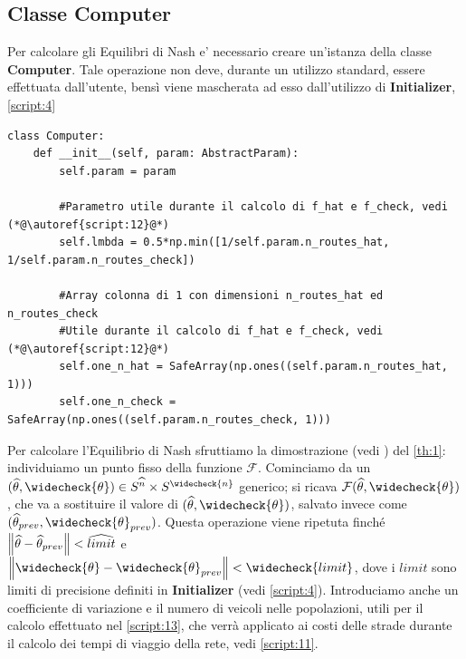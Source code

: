 \subsection{Classe Computer}
\label{subsec:Computer}

Per calcolare gli Equilibri di Nash e' necessario creare un'istanza della classe \textbf{Computer}. Tale operazione non deve, durante un utilizzo standard, essere effettuata dall'utente,
bensì viene mascherata ad esso dall'utilizzo di \textbf{Initializer}, \autoref{script:4}

\begin{lstlisting}[style=myStile, caption={Computer}, label={script:8}]
    class Computer:    
    def __init__(self, param: AbstractParam):
        self.param = param
        
        #Parametro utile durante il calcolo di f_hat e f_check, vedi (*@\autoref{script:12}@*)
        self.lmbda = 0.5*np.min([1/self.param.n_routes_hat, 1/self.param.n_routes_check])
        
        #Array colonna di 1 con dimensioni n_routes_hat ed n_routes_check 
        #Utile durante il calcolo di f_hat e f_check, vedi (*@\autoref{script:12}@*)
        self.one_n_hat = SafeArray(np.ones((self.param.n_routes_hat, 1)))
        self.one_n_check = SafeArray(np.ones((self.param.n_routes_check, 1)))
\end{lstlisting}

Per calcolare l'Equilibrio di Nash sfruttiamo la dimostrazione (vedi \cite[Cap. 4]{MR4911797}) del \autoref{th:1}: individuiamo un punto fisso della funzione $\mathcal{F}$.
Cominciamo da un $(\widehat{\theta}, \widecheck{\theta})\in S^{\widehat{n}}\times S^{\widecheck{n}}$ generico; si ricava $\mathcal{F}(\widehat{\theta}, \widecheck{\theta})$,
che va a sostituire il valore di $(\widehat{\theta}, \widecheck{\theta})$, salvato invece come $(\widehat{\theta}_{prev}, \widecheck{\theta}_{prev})$. Questa operazione viene ripetuta finché
$\left\|\widehat{\theta} - \widehat{\theta}_{prev}\right\| < \widehat{limit}$ e $\norm{\widecheck{\theta} - \widecheck{\theta}_{prev}} < \widecheck{limit}$, dove i $limit$ sono limiti di precisione
definiti in \textbf{Initializer} (vedi \autoref{script:4}). Introduciamo anche un coefficiente di variazione e il numero di veicoli nelle popolazioni, utili per il calcolo effettuato
nel \autoref{script:13}, che verrà applicato ai costi delle strade durante il calcolo dei tempi di viaggio della rete, vedi \autoref{script:11}. 


